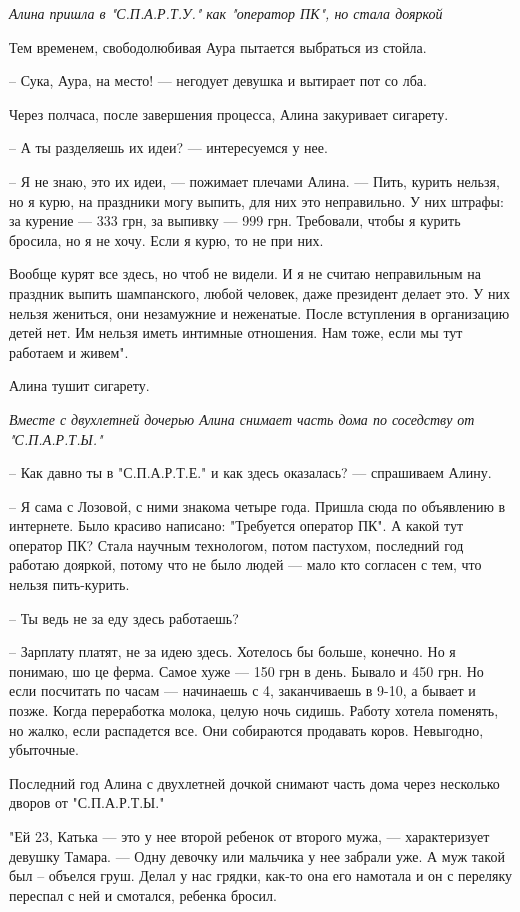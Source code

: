 \emph{Алина пришла в "С.П.А.Р.Т.У." как "оператор ПК", но стала дояркой}

Тем временем, свободолюбивая Аура пытается выбраться из стойла.

– Сука, Аура, на место! --- негодует девушка и вытирает пот со лба.

Через полчаса, после завершения процесса, Алина закуривает сигарету.

– А ты разделяешь их идеи? --- интересуемся у нее.

– Я не знаю, это их идеи, --- пожимает плечами Алина. --- Пить, курить нельзя, но я
курю, на праздники могу выпить, для них это неправильно. У них штрафы: за
курение --- 333 грн, за выпивку --- 999 грн. Требовали, чтобы я курить бросила, но
я не хочу. Если я курю, то не при них. 

Вообще курят все здесь, но чтоб не видели. И я не считаю неправильным на
праздник выпить шампанского, любой человек, даже президент делает это. У них
нельзя жениться, они незамужние и неженатые. После вступления в организацию
детей нет. Им нельзя иметь интимные отношения. Нам тоже, если мы тут работаем и
живем".

Алина тушит сигарету.

\emph{Вместе с двухлетней дочерью Алина снимает часть дома по соседству от "С.П.А.Р.Т.Ы."}

– Как давно ты в "С.П.А.Р.Т.Е." и как здесь оказалась? --- спрашиваем Алину.

– Я сама с Лозовой, с ними знакома четыре года. Пришла сюда по объявлению в
интернете. Было красиво написано: "Требуется оператор ПК". А какой тут оператор
ПК? Стала научным технологом, потом пастухом, последний год работаю дояркой,
потому что не было людей --- мало кто согласен с тем, что нельзя пить-курить.

– Ты ведь не за еду здесь работаешь?

– Зарплату платят, не за идею здесь. Хотелось бы больше, конечно. Но я понимаю,
шо це ферма. Самое хуже --- 150 грн в день. Бывало и 450 грн. Но если посчитать
по часам --- начинаешь с 4, заканчиваешь в 9-10, а бывает и позже. Когда
переработка молока, целую ночь сидишь. Работу хотела поменять, но жалко, если
распадется все. Они собираются продавать коров. Невыгодно, убыточные.

Последний год Алина с двухлетней дочкой снимают часть дома через несколько
дворов от "С.П.А.Р.Т.Ы." 

"Ей 23, Катька --- это у нее второй ребенок от второго мужа, --- характеризует
девушку Тамара. --- Одну девочку или мальчика у нее забрали уже. А муж такой был
– объелся груш. Делал у нас грядки, как-то она его намотала и он с переляку
переспал с ней и смотался, ребенка бросил. 

